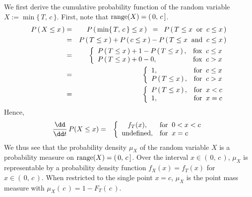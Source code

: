 \vskip 0.5cm
\proof
We first derive the cumulative probability function of the random variable $X := \min\{\,T,\,c\,\}$.
First, note that $\textnormal{range}(X) = (\,0,\,c\,]$.
\begin{eqnarray*}
P\left(\,X \leq x\,\right)
&=& P\left(\,\min\{\,T,\,c\,\}\leq x \,\right)
\;\;=\;\; P\left(\,T \leq x \;\;\textnormal{or}\;\; c \leq x \,\right) \\
&=&  P\left(\,T \leq x\,\right) + P\left(\,c \leq x \,\right)
   - P\left(\,T \leq x \;\;\textnormal{and}\;\; c \leq x \,\right) \\
&=&
\left\{\begin{array}{ll}
P\left(\,T \leq x\,\right) + 1 - P\left(\,T \leq x \,\right), & \textnormal{fox}\;\; c \leq x \\
P\left(\,T \leq x\,\right) + 0 - 0,                           & \textnormal{fox}\;\; c >    x \\
\end{array}\right. \\
&=&
\left\{\begin{array}{ll}
1,                          & \textnormal{for}\;\; c \leq x \\
P\left(\,T \leq x\,\right), & \textnormal{for}\;\; c >    x \\
\end{array}\right. \\
&=&
\left\{\begin{array}{ll}
P\left(\,T \leq x\,\right), & \textnormal{for}\;\; x < c \\
1,                          & \textnormal{for}\;\; x = c \\
\end{array}\right.
\end{eqnarray*}
Hence,
\begin{eqnarray*}
\dfrac{\dd}{\dd t}\,P(X \leq x)
&=&
\left\{\begin{array}{cl}
f_{T}(x),               & \textnormal{for}\;\; 0< x < c \\
\textnormal{undefined}, & \textnormal{for}\;\; x = c \\
\end{array}\right.
\\
\end{eqnarray*}
{\color{red}We thus see that the probability density $\mu_{X}$ of the random variable $X$
is a probability measure on $\textnormal{range}(X) = (\,0,\,c\,]$.
Over the interval $x \in (\,0,\,c\,)$, $\mu_{X}$ is representable by a probability density
function $f_{X}(x) = f_{T}(x)$ for $x \in (\,0,\,c\,)$.
When restricted to the single point $x = c$, $\mu_{X}$ is the point mass measure with
$\mu_{X}(\,c\,) = 1 - F_{T}(\,c\,)$.}
